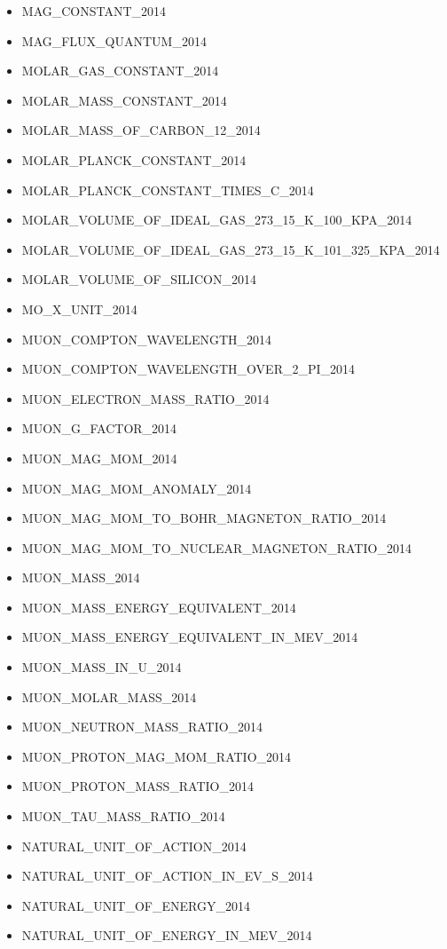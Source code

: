 \begin{itemize}
\item
  MAG\_CONSTANT\_2014
\item
  MAG\_FLUX\_QUANTUM\_2014
\item
  MOLAR\_GAS\_CONSTANT\_2014
\item
  MOLAR\_MASS\_CONSTANT\_2014
\item
  MOLAR\_MASS\_OF\_CARBON\_12\_2014
\item
  MOLAR\_PLANCK\_CONSTANT\_2014
\item
  MOLAR\_PLANCK\_CONSTANT\_TIMES\_C\_2014
\item
  MOLAR\_VOLUME\_OF\_IDEAL\_GAS\_273\_15\_K\_100\_KPA\_2014
\item
  MOLAR\_VOLUME\_OF\_IDEAL\_GAS\_273\_15\_K\_101\_325\_KPA\_2014
\item
  MOLAR\_VOLUME\_OF\_SILICON\_2014
\item
  MO\_X\_UNIT\_2014
\item
  MUON\_COMPTON\_WAVELENGTH\_2014
\item
  MUON\_COMPTON\_WAVELENGTH\_OVER\_2\_PI\_2014
\item
  MUON\_ELECTRON\_MASS\_RATIO\_2014
\item
  MUON\_G\_FACTOR\_2014
\item
  MUON\_MAG\_MOM\_2014
\item
  MUON\_MAG\_MOM\_ANOMALY\_2014
\item
  MUON\_MAG\_MOM\_TO\_BOHR\_MAGNETON\_RATIO\_2014
\item
  MUON\_MAG\_MOM\_TO\_NUCLEAR\_MAGNETON\_RATIO\_2014
\item
  MUON\_MASS\_2014
\item
  MUON\_MASS\_ENERGY\_EQUIVALENT\_2014
\item
  MUON\_MASS\_ENERGY\_EQUIVALENT\_IN\_MEV\_2014
\item
  MUON\_MASS\_IN\_U\_2014
\item
  MUON\_MOLAR\_MASS\_2014
\item
  MUON\_NEUTRON\_MASS\_RATIO\_2014
\item
  MUON\_PROTON\_MAG\_MOM\_RATIO\_2014
\item
  MUON\_PROTON\_MASS\_RATIO\_2014
\item
  MUON\_TAU\_MASS\_RATIO\_2014
\item
  NATURAL\_UNIT\_OF\_ACTION\_2014
\item
  NATURAL\_UNIT\_OF\_ACTION\_IN\_EV\_S\_2014
\item
  NATURAL\_UNIT\_OF\_ENERGY\_2014
\item
  NATURAL\_UNIT\_OF\_ENERGY\_IN\_MEV\_2014

\end{itemize}
